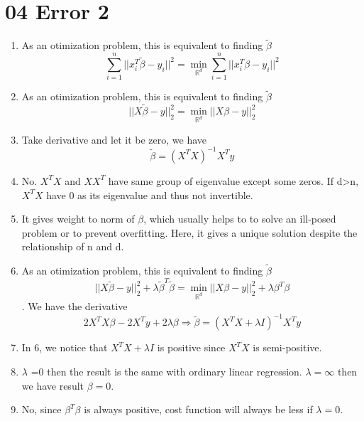 \documentclass[10pt, oneside]{article}
\begin{document}
\section{04 Error 2}
\begin{enumerate}
	\item As an otimization problem, this is equivalent to finding $ \tilde{\beta}$ $$\sum_{i=1}^{n}||x_i^T\tilde{\beta} -y_i||^2=\min_{\mathbb{R}^d}\sum_{i=1}^{n}||x_i^T\beta-y_i||^2$$
	\item As an otimization problem, this is equivalent to finding $ \tilde{\beta}$ $$||X\tilde{\beta} -y||_2^2=\min_{\mathbb{R}^d}||X\beta-y||_2^2$$
	\item Take derivative and let it be zero, we have $$
	\tilde{\beta}=(X^TX)^{-1}X^Ty
	$$
	\item No. $X^TX$ and $XX^T$ have same group of eigenvalue except some zeros. If d>n, $X^TX$ have 0 as its eigenvalue and thus not invertible. 
	\item  It gives weight to norm of $\beta$, which usually helps to to solve an ill-posed problem or to prevent overfitting. Here, it gives a unique solution despite the relationship of n and d. 
	\item As an otimization problem, this is equivalent to finding $ \tilde{\beta}$ $$||X\tilde{\beta} -y||_2^2+\lambda \tilde{\beta}^T\tilde{\beta}=\min_{\mathbb{R}^d}||X\beta-y||_2^2 +\lambda \beta^T\beta$$. We have the derivative
	$$
	2X^TX\beta-2X^Ty+2\lambda \beta \Rightarrow \tilde{\beta}=(X^TX+\lambda I)^{-1}X^T y
	$$
	\item In 6, we notice that $X^TX+\lambda I$ is positive since $X^TX$ is semi-positive.
	\item $\lambda$ =0 then the result is the same with ordinary linear regression. $\lambda =\infty$ then we have result $\beta=0$.
	\item No, since $\beta^T\beta$ is always positive, cost function will always be less if $\lambda=0$. 
	
\end{enumerate}
\end{document}
